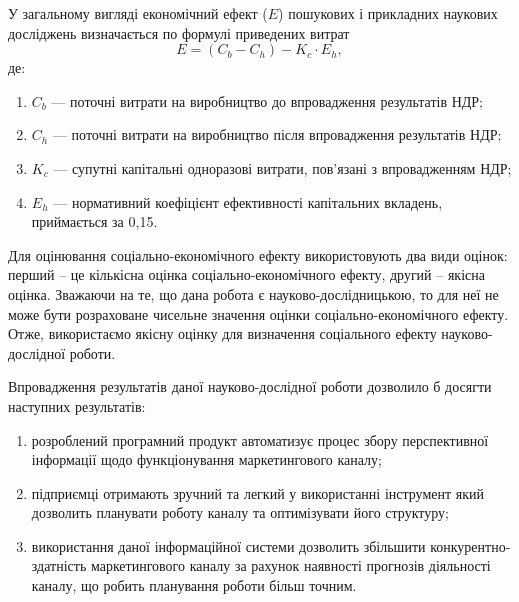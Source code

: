 У загальному вигляді економічний ефект ($E$) пошукових і прикладних наукових досліджень визначається по формулі приведених витрат
\begin{equation}
E = (C_b - C_h) - K_c   \cdot   E_h, \nonumber
\end{equation}
де:
\begin{enumerate}
\item $C_b$ --- поточні витрати на виробництво до впровадження результатів НДР;
\item $C_h$ --- поточні витрати на виробництво після впровадження результатів НДР;
\item $K_c$ --- супутні капітальні одноразові витрати, пов'язані з впровадженням НДР;
\item $E_h$ --- нормативний коефіцієнт ефективності капітальних вкладень, приймається за 0,15.
\end{enumerate}

Для оцінювання соціально-економічного ефекту використовують два види оцінок: перший – це кількісна оцінка соціально-економічного ефекту, другий – якісна оцінка. Зважаючи на те, що дана робота є науково-дослідницькою, то для неї не може бути розраховане чисельне значення оцінки соціально-економічного ефекту. Отже, використаємо якісну оцінку для визначення соціального ефекту науково-дослідної роботи.

Впровадження результатів даної науково-дослідної роботи дозволило б досягти наступних результатів:
\begin{enumerate}
\item розроблений програмний продукт автоматизує процес збору перспективної інформації щодо функціонування маркетингового каналу;
\item підприємці отримають зручний та легкий у використанні інструмент який дозволить планувати роботу каналу та оптимізувати його структуру;
\item використання даної інформаційної системи дозволить збільшити конкурентно-здатність маркетингового каналу за рахунок наявності прогнозів діяльності каналу, що робить планування роботи більш точним.
\end{enumerate}
